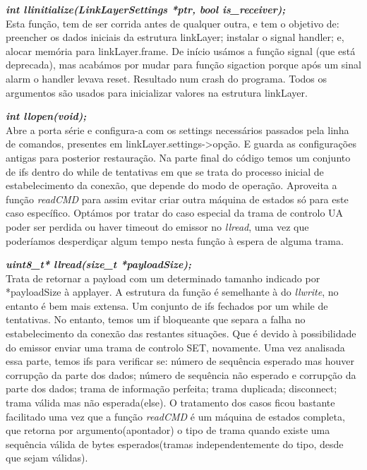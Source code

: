 \documentclass[a4paper]{article}
\begin{document}
\noindent\textbf{\textit{int llinitialize(LinkLayerSettings *ptr, bool
is\_receiver);}}\\
Esta função, tem de ser corrida antes de qualquer outra, e tem o objetivo de: preencher os dados iniciais da estrutura
linkLayer; instalar o signal handler; e, alocar memória para
linkLayer.frame. De início usámos a função signal (que
está deprecada), mas acabámos por mudar para função sigaction porque após um sinal alarm
o handler levava reset. Resultado num crash do programa. Todos os argumentos
são usados para inicializar valores na estrutura linkLayer.\linebreak

\noindent\textbf{\textit{int llopen(void);}}\\
Abre a porta série e configura-a com os settings necessários passados pela linha de
comandos, presentes em linkLayer.settings->{opção}. E guarda as configurações
antigas para posterior restauração. Na parte final do código temos um conjunto
de ifs dentro do while de tentativas em que se trata do processo inicial de
estabelecimento da conexão, que depende do modo de operação. Aproveita a função \textit{readCMD} para assim
evitar criar outra máquina de estados só para este caso específico. Optámos por
tratar do caso especial da trama de controlo UA poder ser
perdida ou haver timeout do emissor no \textit{llread}, uma vez
que poderíamos desperdiçar algum tempo nesta função à espera de alguma trama.
\linebreak

\noindent\textbf{\textit{uint8\_t* llread(size\_t *payloadSize);}}\\
Trata de retornar a payload com um determinado tamanho indicado por
*payloadSize à applayer. A estrutura da função é semelhante à do
\textit{llwrite}, no entanto é bem mais
extensa. Um conjunto de ifs fechados por um while de tentativas. No entanto,
temos um if bloqueante que separa a falha no estabelecimento da conexão das
restantes situações. Que é devido à possibilidade do emissor enviar uma trama de controlo SET,
novamente. Uma vez analisada essa parte, temos ifs para verificar se: número de
sequência esperado mas houver corrupção da parte dos dados; número de
sequência não esperado e corrupção da parte dos dados; trama de informação
perfeita; trama duplicada; disconnect; trama válida mas não esperada(else). O
tratamento dos casos ficou bastante facilitado uma vez que a função
\textit{readCMD} é um máquina de estados completa, que retorna por
argumento(apontador) o tipo de trama quando existe uma sequência válida de
bytes esperados(tramas independentemente do tipo, desde que sejam válidas). \linebreak
\end{document}
